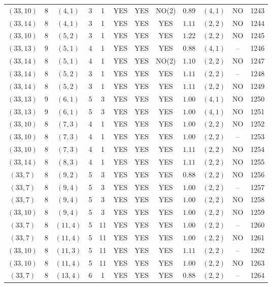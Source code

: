 \begin{longtable}{|c|c|c|c|c|c|c|c|c|c|c|c|}
$(33,10)$ & 8 & $(4,1)$ & 3 & 1 & YES & YES & NO(2) & $0.89$ & $(4,1)$ & NO & 1243\\
$(33,14)$ & 8 & $(4,1)$ & 3 & 1 & YES & YES & YES & $1.11$ & $(2,2)$ & NO & 1244\\
$(33,10)$ & 8 & $(5,2)$ & 3 & 1 & YES & YES & YES & $1.22$ & $(2,2)$ & NO & 1245\\
$(33,13)$ & 9 & $(5,1)$ & 4 & 1 & YES & YES & YES & $0.88$ & $(4,1)$ & -- & 1246\\
$(33,14)$ & 8 & $(5,1)$ & 4 & 1 & YES & YES & NO(2) & $1.10$ & $(2,2)$ & NO & 1247\\
$(33,14)$ & 8 & $(5,2)$ & 3 & 1 & YES & YES & YES & $1.11$ & $(2,2)$ & -- & 1248\\
$(33,14)$ & 8 & $(5,2)$ & 3 & 1 & YES & YES & YES & $1.11$ & $(2,2)$ & NO & 1249\\
$(33,13)$ & 9 & $(6,1)$ & 5 & 3 & YES & YES & YES & $1.00$ & $(4,1)$ & NO & 1250\\
$(33,13)$ & 9 & $(6,1)$ & 5 & 3 & YES & YES & YES & $1.00$ & $(4,1)$ & NO & 1251\\
$(33,10)$ & 8 & $(7,3)$ & 4 & 1 & YES & YES & YES & $1.00$ & $(2,2)$ & NO & 1252\\
$(33,10)$ & 8 & $(7,3)$ & 4 & 1 & YES & YES & YES & $1.00$ & $(2,2)$ & -- & 1253\\
$(33,10)$ & 8 & $(7,3)$ & 4 & 1 & YES & YES & YES & $1.11$ & $(2,2)$ & NO & 1254\\
$(33,14)$ & 8 & $(8,3)$ & 4 & 1 & YES & YES & YES & $1.11$ & $(2,2)$ & NO & 1255\\
$(33,7)$ & 8 & $(9,2)$ & 5 & 3 & YES & YES & YES & $0.88$ & $(2,2)$ & NO & 1256\\
$(33,7)$ & 8 & $(9,4)$ & 5 & 3 & YES & YES & YES & $1.00$ & $(2,2)$ & -- & 1257\\
$(33,7)$ & 8 & $(9,4)$ & 5 & 3 & YES & YES & YES & $1.00$ & $(2,2)$ & NO & 1258\\
$(33,10)$ & 8 & $(9,4)$ & 5 & 3 & YES & YES & YES & $1.00$ & $(2,2)$ & NO & 1259\\
$(33,7)$ & 8 & $(11,4)$ & 5 & 11 & YES & YES & YES & $1.00$ & $(2,2)$ & -- & 1260\\
$(33,7)$ & 8 & $(11,4)$ & 5 & 11 & YES & YES & YES & $1.00$ & $(2,2)$ & NO & 1261\\
$(33,10)$ & 8 & $(11,3)$ & 5 & 11 & YES & YES & YES & $1.11$ & $(2,2)$ & -- & 1262\\
$(33,10)$ & 8 & $(11,4)$ & 5 & 11 & YES & YES & YES & $1.00$ & $(2,2)$ & NO & 1263\\
$(33,7)$ & 8 & $(13,4)$ & 6 & 1 & YES & YES & YES & $0.88$ & $(2,2)$ & -- & 1264\\

\end{longtable}
